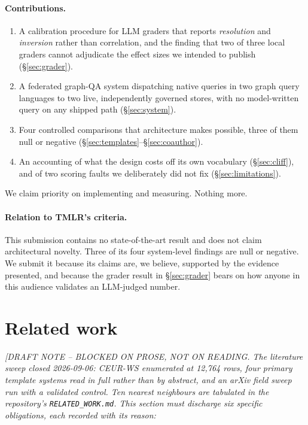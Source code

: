 \documentclass{article}
\newcommand{\expref}[1]{\iftoggle{trace}{\,{\scriptsize\textcolor{gray}{\texttt{[#1]}}}}{}}
\newcommand{\claimref}[1]{\iftoggle{trace}{\,{\scriptsize\textcolor{gray}{\texttt{<#1>}}}}{}}
\begin{document}
\paragraph{Contributions.}
\begin{enumerate}
\item A calibration procedure for LLM graders that reports \emph{resolution} and
      \emph{inversion} rather than correlation, and the finding that two of three
      local graders cannot adjudicate the effect sizes we intended to publish
      (\S\ref{sec:grader}).\expref{EXP-2026-09-008}
\item A federated graph-QA system dispatching native queries in two graph query
      languages to two live, independently governed stores, with no model-written
      query on any shipped path (\S\ref{sec:system}).\claimref{C-007}
\item Four controlled comparisons that architecture makes possible, three of them
      null or negative (\S\ref{sec:templates}--\S\ref{sec:coauthor}).
\item An accounting of what the design costs off its own vocabulary
      (\S\ref{sec:cliff}), and of two scoring faults we deliberately did not fix
      (\S\ref{sec:limitations}).
\end{enumerate}

We claim priority on implementing and measuring. Nothing more.

\paragraph{Relation to TMLR's criteria.} This submission contains no
state-of-the-art result and does not claim architectural novelty. Three of its
four system-level findings are null or negative. We submit it because its claims
are, we believe, supported by the evidence presented, and because the grader
result in \S\ref{sec:grader} bears on how anyone in this audience validates an
LLM-judged number.

\section{Related work}
\label{sec:related}

\emph{[DRAFT NOTE -- BLOCKED ON PROSE, NOT ON READING. The literature sweep
closed 2026-09-06: CEUR-WS enumerated at 12{,}764 rows, four primary template
systems read in full rather than by abstract, and an arXiv field sweep run with a
validated control. Ten nearest neighbours are tabulated in the repository's
\texttt{RELATED\_WORK.md}. This section must discharge six specific obligations,
each recorded with its reason:}
\end{document}

